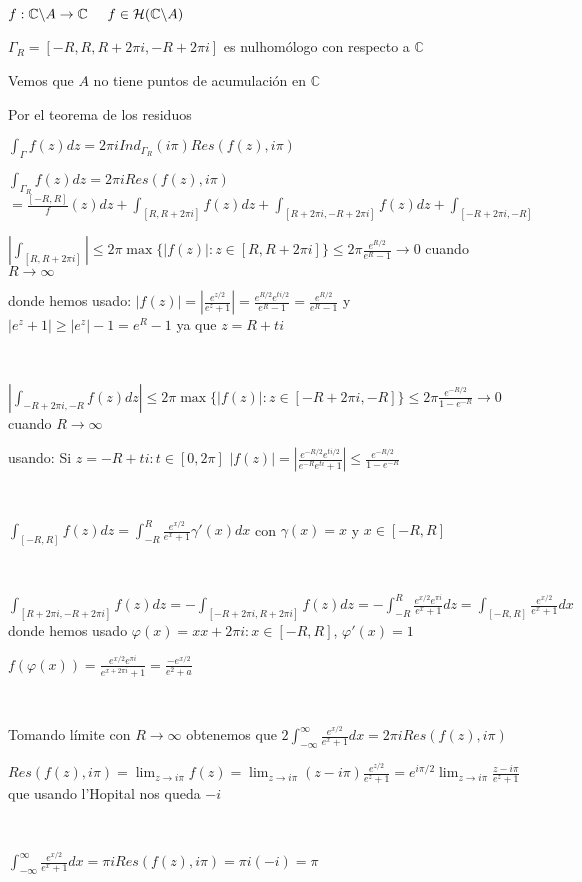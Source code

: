 $f : \mathbb{C}\backslash A \rightarrow \mathbb{C}\hspace{0.5cm} f\in\mathcal{H}(\mathbb{C}\backslash A)$

$\Gamma_R  = [-R,R,R+2\pi i, -R+2\pi i]$ es nulhomólogo con respecto a $\mathbb{C}$

Vemos que $A$ no tiene puntos de acumulación en $\mathbb{C}$

Por el teorema de los residuos

$\int_{\Gamma} f(z)dz = 2\pi i Ind_{\Gamma_R}(i\pi) Res(f(z),i\pi)$

$\int_{\Gamma_R} f(z)dz = 2\pi i Res(f(z),i\pi)$
$= \frac{[-R,R]} f(z)dz + \int_{[R,R+2\pi i]} f(z)dz + \int_{[R+2\pi i, -R+2\pi i]} f(z)dz + \int_{[-R+2\pi i, -R]}$


$\left| \int_{[R,R+2\pi i]} \right| \leq 2\pi\max\{ |f(z)| : z\in [R,R+2\pi i] \} \leq 2\pi \frac{e^{R/2}}{e^R-1} \rightarrow 0$ cuando $R\rightarrow \infty$

donde hemos usado:
$|f(z)| = |\frac{e^{z/2}}{e^z+1}| = \frac{e^{R/2} e^{ti/2}}{e^R-1} = \frac{e^{R/2}}{e^R-1}$
y
$|e^z+1| \geq |e^z|-1 = e^R-1$ ya que $z=R+ti$


\

$\left| \int_{-R+2\pi i, -R} f(z)dz \right| \leq 2\pi \max \{ |f(z)| : z\in[-R+2\pi i, -R] \} \leq 2\pi \frac{e^{-R/2}}{1-e^{-R}} \rightarrow 0$ cuando $R\rightarrow\infty$

usando:
Si $z= -R+ti : t\in[0,2\pi]$
$|f(z)| = \left| \frac{e^{-R/2}e^{ti/2}}{e^{-R}e^{ti}+1} \right| \leq \frac{e^{-R/2}}{1-e^{-R}}$

\

$\int_{[-R,R]} f(z)dz = \int_{-R}^{R} \frac{e^{x/2}}{e^x+1} \gamma'(x)dx$ con $\gamma(x)=x$ y $x\in[-R,R]$

\

$\int_{[R+2\pi i, -R+2\pi i]} f(z)dz = -\int_{[-R+2\pi i, R+2\pi i]} f(z)dz = -\int_{-R}^{R} \frac{e^{x/2}e^{\pi i}}{e^x+1}dz = \int_{[-R,R]} \frac{e^{x/2}}{e^x+1}dx$
donde hemos usado
$\varphi (x) = xx+2\pi i : x\in[-R,R]$, $\varphi'(x) = 1$

$f(\varphi(x)) = \frac{e^{x/2}e^{\pi i}}{e^{x+2\pi i}+1} = \frac{-e^{x/2}}{e^2+a}$

\

Tomando límite con $R\rightarrow\infty$ obtenemos que
$2\int_{-\infty}^{\infty} \frac{e^{x/2}}{e^x+1} dx = 2\pi iRes(f(z),i\pi)$

$Res(f(z),i\pi) = \lim_{z\rightarrow i\pi} f(z) = \lim_{z\rightarrow i\pi} (z-i\pi) \frac{e^{z/2}}{e^z+1} = e^{i\pi/2} \lim_{z\rightarrow i\pi} \frac{z-i\pi}{e^z+1}$
que usando l'Hopital nos queda
$-i$

\

$\int_{-\infty}^{\infty} \frac{e^{x/2}}{e^x+1} dx = \pi iRes(f(z),i\pi) = \pi i(-i) = \pi $

